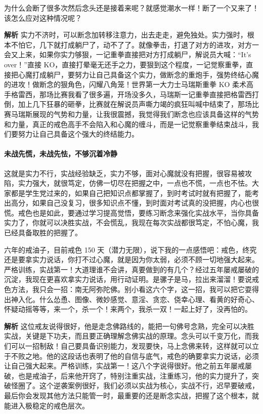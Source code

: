 \begin{case}[实战中的问题]
    为什么会断了很多次然后念头还是接着来呢？就感觉潮水一样！断了一个又来了！该怎么应对这种情况呢？

    \textbf{解析} 实力不济时，可以断念加转移注意力，出去走走，避免独处。实力强时，根本不怕它，几下就打成躺尸了，动不了了。就像拳击，打退了对方的进攻，对方一会又上来，如果你实力够狠，一记重拳直接把对方打成躺尸，解说员大喊：“It's over！”直接 KO，直接打晕毫无还手之力，要狠到这个程度，一记觉察重拳，直接把心魔打成躺尸，要努力让自己具备这个实力，做断念的重炮手，强势终结心魔的进攻！做断念的狠角色，闪耀八角笼！世界第一大力士马瑞斯重拳 KO 柔术高手格雷西，那场比赛我看了很多遍，开场没多久，马瑞斯一记重拳直接把格雷西打倒，加上几下狂暴的砸拳，比赛就在解说员声嘶力竭的疯狂叫喊中结束了，那场比赛马瑞斯展现的气势和力量，让我很震撼，我觉得我们断念也应该具备这样的气势和力量，真正的戒色高手不会陷入和心魔的缠斗，而是一记觉察重拳结束战斗，我们要努力让自己具备这个强大的终结能力。
\end{case}

\paragraph{未战先慌，未战先怯，不够沉着冷静}

这就是实力不行，实战经验缺乏，实力不够，面对心魔就没有把握，很容易被攻陷，实力强大，就很笃定，仿佛一切尽在把握之中，一点也不慌，一点也不怯。大家都是学生党过来的，如果自己把知识点都掌握了，到时考试时就有把握了，能考出高分，如果自己没复习，很多知识点不懂，到时面对考试真的没把握，内心也很慌。戒色也是如此，要通过学习提高觉悟，要练习断念来强化实战水平，当你具备实力了，你就可以决胜实战，不会慌乱，我现在每次实战都很笃定，不怕心魔，我已经具备取胜的把握了。

\begin{case}
    六年的戒油子，目前戒色 150 天（潜力无限），说下我的一点感悟吧：戒色，终究还是要拿实力说话，你打不过心魔，就是因为你太弱，必须不顾一切地强大起来。严格训练，实战第一！大道理谁不会讲，真要做到的有几个？经过五年屡戒屡破的沉淀，我现在更喜欢拿实力说话，用行动证明。是骡子是马，拉出来溜溜！要说戒色方法，我只会一招：南无阿弥陀佛。别小看这六个字，这一招，我可以把它耍得出神入化。什么怂恿、图像、微妙感觉、意淫、贪恋、侥幸心理、看黄的好奇心、怀疑动摇等等，来一个，杀一个！来两个，我杀一双！一起上好了，没再怕的。

    \textbf{解析} 这位戒友说得很好，他是走念佛路线的，能把一句佛号念熟，完全可以决胜实战，关键是下功夫，而且要正确理解念佛实战的原理。念头可以千变万化，而我们可以一招制敌！自己要具备识别能力，发现要快，马上念佛来转，这样就可以立于不败之地。他的这段话也表明了他的自信与底气，戒色的确要拿实力说话，必须让自己强大起来。严格训练，实战第一！这八个字说得很好。他之前五年屡戒屡破，也是戒油子，后来他开窍了，特别注重实战，注重练习，他的实力提升了，突破怪圈了。这个逆袭案例很好，我们必须以实战为核心，实战不行，迟早要破戒，最后你会发现其他方法只能管一时，最重要的还是断念实战，把握了这个根本，就能进入极稳定的戒色层次。
\end{case}

